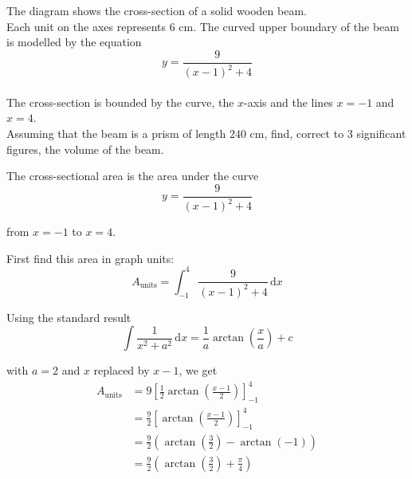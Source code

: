 \documentclass[leqno]{article}
\begin{document}
\begin{enumerate}[
  label=\textbf{\arabic*.},
  leftmargin=*,
  topsep=0pt,
  partopsep=0pt,
  parsep=0pt
]
\begin{figure}[H]
    \centering
{}
\end{figure}


The diagram shows the cross-section of a solid wooden beam. \\
Each unit on the axes represents $6$ cm. The curved upper boundary of the beam is modelled by the equation
\[
y=\frac{9}{(x-1)^2+4}
\] \\
The cross-section is bounded by the curve, the $x$-axis and the lines $x=-1$ and $x=4$. \\
Assuming that the beam is a prism of length $240$ cm, find, correct to $3$ significant figures, the volume of the beam.  \\

\vspace*{10pt}

\begin{djsSolution}
The cross-sectional area is the area under the curve
\[
y=\frac{9}{(x-1)^2+4}
\]

from $x=-1$ to $x=4$.

First find this area in graph units:
\[
A_{\text{units}}=\int_{-1}^{4}\frac{9}{(x-1)^2+4}\,\mathrm{d}x
\]

Using the standard result
\[
\int \frac{1}{x^2+a^2}\,\mathrm{d}x=\frac{1}{a}\arctan\left(\frac{x}{a}\right)+c
\]

with $a=2$ and $x$ replaced by $x-1$, we get
\begin{align*}
A_{\text{units}}
&=9\left[\frac{1}{2}\arctan\left(\frac{x-1}{2}\right)\right]_{-1}^{4} \\
&=\frac{9}{2}\left[\arctan\left(\frac{x-1}{2}\right)\right]_{-1}^{4} \\
&=\frac{9}{2}\left(\arctan\left(\frac{3}{2}\right)-\arctan(-1)\right) \\
&=\frac{9}{2}\left(\arctan\left(\frac{3}{2}\right)+\frac{\pi}{4}\right)
\end{align*}


\end{djsSolution}
\end{enumerate}
\end{document}

